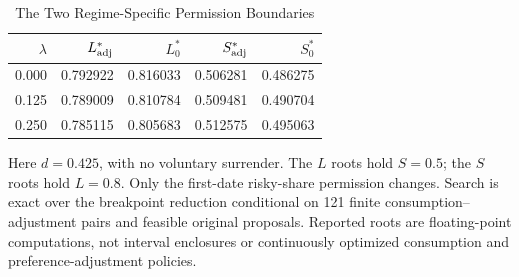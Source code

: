 \begin{table}[tbp]
\centering\small
\caption{The Two Regime-Specific Permission Boundaries}
\label{tab:r9_permissions}
\begin{tabular}{rrrrr}
\toprule
$\lambda$ & $L^*_{\rm adj}$ & $L^*_0$ & $S^*_{\rm adj}$ & $S^*_0$ \\
\midrule
0.000 & 0.792922 & 0.816033 & 0.506281 & 0.486275 \\
0.125 & 0.789009 & 0.810784 & 0.509481 & 0.490704 \\
0.250 & 0.785115 & 0.805683 & 0.512575 & 0.495063 \\
\bottomrule
\end{tabular}
\begin{minipage}{0.98\textwidth}\footnotesize\medskip
Here $d=0.425$, with no voluntary surrender. The $L$ roots hold $S=0.5$; the $S$ roots hold $L=0.8$. Only the first-date risky-share permission changes. Search is exact over the breakpoint reduction conditional on 121 finite consumption--adjustment pairs and feasible original proposals. Reported roots are floating-point computations, not interval enclosures or continuously optimized consumption and preference-adjustment policies.
\end{minipage}
\end{table}
